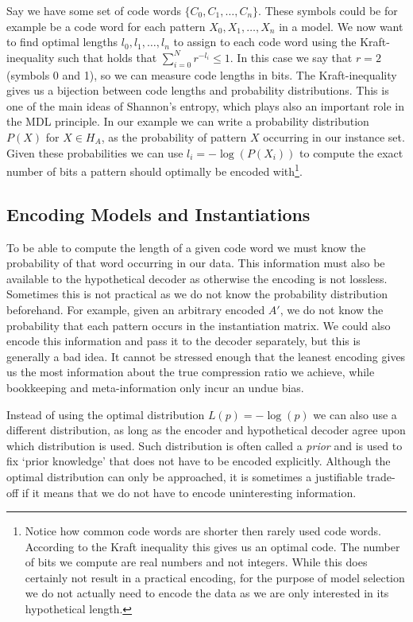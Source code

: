 \documentclass{llncs}
\begin{document}
Say we have some set of code words $\{C_0,C_1,\dots,C_n\}$. These symbols could be for example be a code word for each pattern $X_0, X_1,\dots,X_n$ in a model. We now want to find optimal lengths $l_0,l_1,\dots,l_n$ to assign to each code word using the Kraft-inequality such that holds that $\displaystyle\sum^N_{i=0}r^{-l_i} \leq 1$. In this case we say that $r=2$ (symbols 0 and 1), so we can measure code lengths in bits. 
The Kraft-inequality gives us a bijection between code lengths and probability distributions. This is one of the main ideas of Shannon's entropy, which plays also an important role in the MDL principle. In our example we can write a probability distribution $P(X)$ for $X \in H_A$, as the probability of pattern $X$ occurring in our instance set. Given these probabilities we can use $l_i=-\log(P(X_i))$ to compute the exact number of bits a pattern should optimally be encoded with\footnote{Notice how common code words are shorter then rarely used code words. According to the Kraft inequality this gives us an optimal code. The number of bits we compute are real numbers and not integers. While this does certainly not result in a practical encoding, for the purpose of model selection we do not actually need to encode the data as we are only interested in its hypothetical length.}.

\subsection{Encoding Models and Instantiations}
To be able to compute the length of a given code word we must know the probability of that word occurring in our data. This information must also be available to the hypothetical decoder as otherwise the encoding is not lossless. Sometimes this is not practical as we do not know the probability distribution beforehand. For example, given an arbitrary encoded $A'$, we do not know the probability that each pattern occurs in the instantiation matrix. We could also encode this information and pass it to the decoder separately, but this is generally a bad idea. It cannot be stressed enough that the leanest encoding gives us the most information about the true compression ratio we achieve, while bookkeeping and meta-information only incur an undue bias. 

Instead of using the optimal distribution $L(p)=-\log(p)$ we can also use a different distribution, as long as the encoder and hypothetical decoder agree upon which distribution is used. Such distribution is often called a \emph{prior} and is used to fix `prior knowledge' that does not have to be encoded explicitly. Although the optimal distribution can only be approached, it is sometimes a justifiable trade-off if it means that we do not have to encode uninteresting information.  
\end{document}
